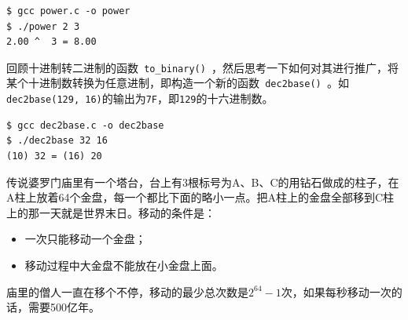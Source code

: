 \begin{frame}
  
\end{frame}

\begin{frame}
\begin{lstlisting}
$ gcc power.c -o power
$ ./power 2 3
2.00 ^  3 = 8.00
\end{lstlisting}
\end{frame}

\begin{frame}
  \begin{biancheng}
    回顾十进制转二进制的函数\lstinline| to_binary() |，然后思考一下如何对其进行推广，将某个十进制数转换为任意进制，即构造一个新的函数\lstinline| dec2base() |。如\lstinline|dec2base(129, 16)|的输出为\lstinline|7F|，即\lstinline|129|的十六进制数。
  \end{biancheng}
\end{frame}

\begin{frame}
  
\end{frame}

\begin{frame}
\begin{lstlisting}
$ gcc dec2base.c -o dec2base
$ ./dec2base 32 16
(10) 32 = (16) 20
\end{lstlisting}
\end{frame}

\begin{frame}
  \begin{biancheng}
    传说婆罗门庙里有一个塔台，台上有3根标号为A、B、C的用钻石做成的柱子，在A柱上放着64个金盘，每一个都比下面的略小一点。把A柱上的金盘全部移到C柱上的那一天就是世界末日。移动的条件是：
    \begin{itemize}
    \item 一次只能移动一个金盘；
    \item 移动过程中大金盘不能放在小金盘上面。
    \end{itemize}
    庙里的僧人一直在移个不停，移动的最少总次数是$2^{64}-1$次，如果每秒移动一次的话，需要500亿年。
  \end{biancheng}
\end{frame}

